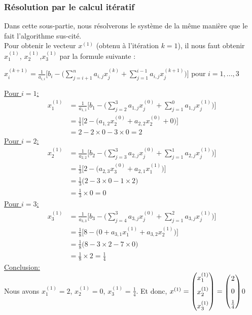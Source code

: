 \subsubsection{Résolution par le calcul itératif}\label{calcite}
Dans cette sous-partie, nous résolverons le système de la même manière que le fait l'algorithme sus-cité.\\
Pour obtenir le vecteur $x^{(1)}$ (obtenu à l'itération $k=1$), il nous faut obtenir $x_1^{(1)}$, $x_2^{(1)}$,$x_3^{(1)}$ par la formule suivante :\\
\begin{center}
$x_{i}^{(k+1)}=\frac{1}{a_{i,i}}\Bigg[b_i-\Bigg(\sum \limits_{j=i+1}^{n}a_{i,j}x_j^{(k)} + \sum \limits_{j=1}^{i-1}a_{i,j}x_j^{(k+1)}\Bigg)\Bigg]   \text{  pour  } i=1, ..., 3$
\end{center}
\underline{Pour $i=1$:}\\
\begin{align}
  x_{1}^{(1)}&=\frac{1}{a_{1,1}}\Bigg[b_1-\Bigg(\sum \limits_{j=2}^{3}a_{1,j}x_j^{(0)} + \sum \limits_{j=1}^{0}a_{1,j}x_j^{(1)}\Bigg)\Bigg]\\
  &=\frac{1}{1}\Bigg[2-\Bigg(a_{1,2}x_2^{(0)} + a_{2,2}x_2^{(0)}+0\Bigg)\Bigg]\\
  &=2-2\times 0 -3\times 0=2
\end{align}
\underline{Pour $i=2$:}\\
\begin{align}
  x_{2}^{(1)}&=\frac{1}{a_{2,2}}\Bigg[b_2-\Bigg(\sum \limits_{j=3}^{3}a_{2,j}x_j^{(0)} + \sum \limits_{j=1}^{1}a_{2,j}x_j^{(1)}\Bigg)\Bigg]\\
  &=\frac{1}{3}\Bigg[2-\Bigg(a_{2,3}x_3^{(0)} + a_{2,1}x_1^{(1)}\Bigg)\Bigg]\\
  &=\frac{1}{3}\Bigg(2-3\times0-1\times2\Bigg)\\
  &=\frac{1}{3}\times 0=0
\end{align}
\underline{Pour $i=3$:}\\
\begin{align}
  x_{3}^{(1)}&=\frac{1}{a_{3,3}}\Bigg[b_3-\Bigg(\sum \limits_{j=4}^{3}a_{3,j}x_j^{(0)} + \sum \limits_{j=1}^{2}a_{3,j}x_j^{(1)}\Bigg)\Bigg]\\
  &=\frac{1}{8}\Bigg[8-\Bigg(0+a_{3,1}x_1^{(1)} + a_{3,2}x_2^{(1)}\Bigg)\Bigg]\\
  &=\frac{1}{8}\Bigg(8-3\times 2 - 7\times 0\Bigg)\\
  &=\frac{1}{8}\times 2=\frac{1}{4}
\end{align}
\underline{Conclusion:}\\
Nous avons $x_1^{(1)}=2$, $x_2^{(1)}=0$,  $x_3^{(1)}=\frac{1}{4}$.  Et donc, $x^{(1)}=
\begin{pmatrix}
  x_1^{(1)}\vspace{6pt}\\
  x_2^{(1)}\vspace{6pt}\\
  x_3^{(1)}
\end{pmatrix}=
\begin{pmatrix}
  2\vspace{6pt}\\
  0\vspace{6pt}\\
  \frac{1}{4}
\end{pmatrix}$0
